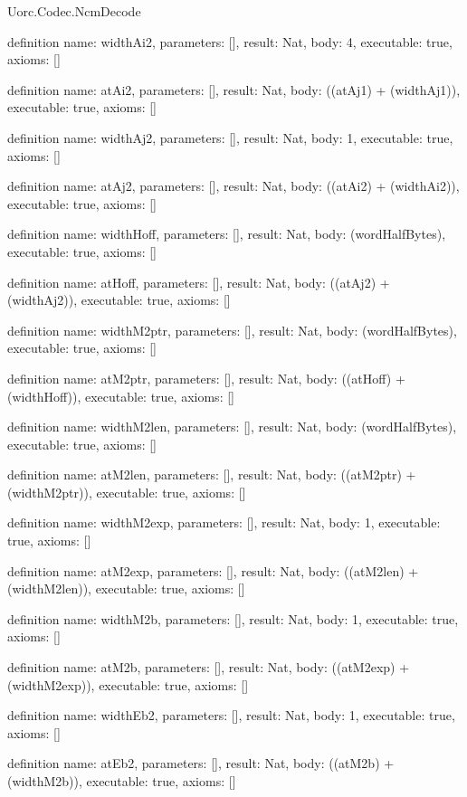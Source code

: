 \begin{lexlean}{Uorc.Codec.NcmDecode}
\begin{semanticmodule}
definition{
  name: widthAi2,
  parameters: [],
  result: Nat,
  body: 4,
  executable: true,
  axioms: []
}

definition{
  name: atAi2,
  parameters: [],
  result: Nat,
  body: ((atAj1) + (widthAj1)),
  executable: true,
  axioms: []
}

definition{
  name: widthAj2,
  parameters: [],
  result: Nat,
  body: 1,
  executable: true,
  axioms: []
}

definition{
  name: atAj2,
  parameters: [],
  result: Nat,
  body: ((atAi2) + (widthAi2)),
  executable: true,
  axioms: []
}

definition{
  name: widthHoff,
  parameters: [],
  result: Nat,
  body: (wordHalfBytes),
  executable: true,
  axioms: []
}

definition{
  name: atHoff,
  parameters: [],
  result: Nat,
  body: ((atAj2) + (widthAj2)),
  executable: true,
  axioms: []
}

definition{
  name: widthM2ptr,
  parameters: [],
  result: Nat,
  body: (wordHalfBytes),
  executable: true,
  axioms: []
}

definition{
  name: atM2ptr,
  parameters: [],
  result: Nat,
  body: ((atHoff) + (widthHoff)),
  executable: true,
  axioms: []
}

definition{
  name: widthM2len,
  parameters: [],
  result: Nat,
  body: (wordHalfBytes),
  executable: true,
  axioms: []
}

definition{
  name: atM2len,
  parameters: [],
  result: Nat,
  body: ((atM2ptr) + (widthM2ptr)),
  executable: true,
  axioms: []
}

definition{
  name: widthM2exp,
  parameters: [],
  result: Nat,
  body: 1,
  executable: true,
  axioms: []
}

definition{
  name: atM2exp,
  parameters: [],
  result: Nat,
  body: ((atM2len) + (widthM2len)),
  executable: true,
  axioms: []
}

definition{
  name: widthM2b,
  parameters: [],
  result: Nat,
  body: 1,
  executable: true,
  axioms: []
}

definition{
  name: atM2b,
  parameters: [],
  result: Nat,
  body: ((atM2exp) + (widthM2exp)),
  executable: true,
  axioms: []
}

definition{
  name: widthEb2,
  parameters: [],
  result: Nat,
  body: 1,
  executable: true,
  axioms: []
}

definition{
  name: atEb2,
  parameters: [],
  result: Nat,
  body: ((atM2b) + (widthM2b)),
  executable: true,
  axioms: []
}


\end{semanticmodule}
\end{lexlean}
